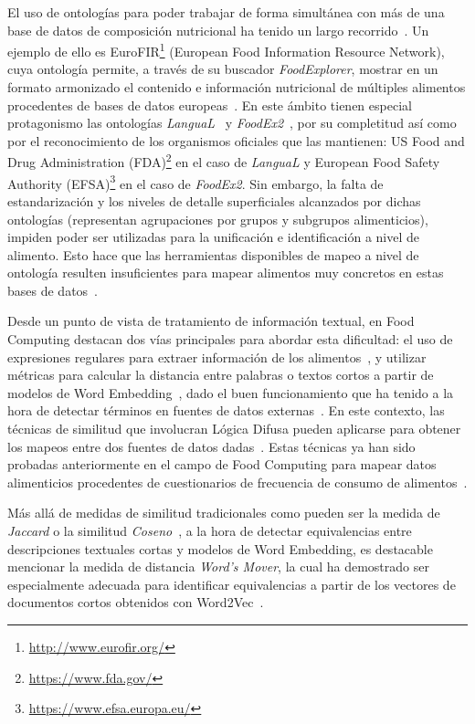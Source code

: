 El uso de ontologías para poder trabajar de forma simultánea con más de una base de datos de composición nutricional ha tenido un largo recorrido~\cite{snae2008foods,dooley2018foodon,6511683}. Un ejemplo de ello es EuroFIR\footnote{\url{http://www.eurofir.org/}} (European Food Information Resource Network), cuya ontología permite, a través de su buscador \textit{FoodExplorer}, mostrar en un formato armonizado el contenido e información nutricional de múltiples alimentos procedentes de bases de datos europeas~\cite{sheehan2008european}. En este ámbito tienen especial protagonismo las ontologías \textit{LanguaL}~\cite{ireland2010langual} y \textit{FoodEx2}~\cite{european2015food}, por su completitud así como por el reconocimiento de los organismos oficiales que las mantienen: US Food and Drug Administration (FDA)\footnote{\url{https://www.fda.gov/}} en el caso de \textit{LanguaL} y European Food Safety Authority (EFSA)\footnote{\url{https://www.efsa.europa.eu/}} en el caso de \textit{FoodEx2}. Sin embargo, la falta de estandarización y los niveles de detalle superficiales alcanzados por dichas ontologías (representan agrupaciones por grupos y subgrupos alimenticios), impiden poder ser utilizadas  para la unificación e identificación a nivel de alimento. Esto hace que las herramientas disponibles de mapeo a nivel de ontología resulten insuficientes para mapear alimentos muy concretos en estas bases de datos~\cite{li2019multi}. 

Desde un punto de vista de tratamiento de información textual, en Food Computing destacan dos vías principales para abordar esta dificultad: el uso de expresiones regulares para extraer información de los alimentos~\cite{chao2016dish}, y utilizar métricas para calcular la distancia entre palabras o textos cortos a partir de modelos de Word Embedding~\cite{Farouk2019MeasuringSS, Kenter2015}, dado el buen funcionamiento que ha tenido a la hora de detectar términos en fuentes de datos externas~\cite{10.1093/jamiaopen/ooz007}. En este contexto, las técnicas de similitud que involucran Lógica Difusa pueden aplicarse para obtener los mapeos entre dos fuentes de datos dadas~\cite{wang2011fast}. Estas técnicas ya han sido probadas anteriormente en el campo de Food Computing para mapear datos alimenticios procedentes de cuestionarios de frecuencia de consumo de alimentos~\cite{10.3389/fnut.2018.00082}.

Más allá de medidas de similitud tradicionales como pueden ser la medida de \textit{Jaccard} o la similitud \textit{Coseno}~\cite{sternitzke2009similarity}, a la hora de detectar equivalencias entre descripciones textuales cortas y modelos de Word Embedding, es destacable mencionar la medida de distancia \textit{Word's Mover}, la cual ha demostrado ser especialmente adecuada para identificar equivalencias a partir de los vectores de documentos cortos obtenidos con Word2Vec~\cite{wmd1,wmd2}.

